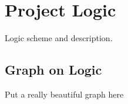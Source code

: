 \chapter{Project Logic} \label{chap:logic}

Logic scheme and description.

\section{Graph on Logic}

	Put a really beautiful graph here

